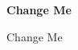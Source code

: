 \documentclass[12]{article}
\renewcommand{\title}[1]{
    \begin{flushleft}
        \Large
        \textbf{#1}

        \vspace{0.4cm}
    \end{flushleft}
}
\newcommand{\introduction}[1]{
    #1
}
\begin{document}
\title{Change Me}

\vspace{0.9cm}

\introduction{Change Me}

\vspace{0.9cm}
\end{document}
